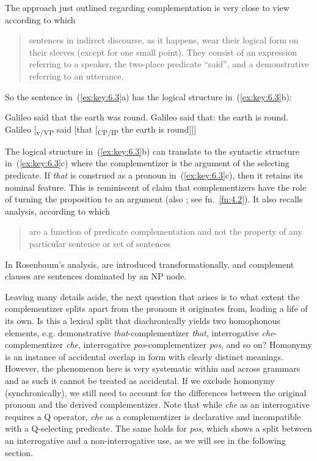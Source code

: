 \documentclass[output=paper]{langsci/langscibook}
\begin{document}
The approach just outlined regarding complementation is very close to
 view according to which \blockquote{sentences
    in indirect discourse, as it happens, wear their logical form on their
    sleeves (except for one small point). They consist of an expression
referring to a speaker, the two-place predicate \enquote{said}, and a
demonstrative referring to an utterance.} So the sentence in~(\ref{ex:key:6.3}a) has the
logical structure in~(\ref{ex:key:6.3}b):

\ea\label{ex:key:6.3}
	\ea Galileo said that the earth was round.
	\ex Galileo said that: the earth is round.
	\ex Galileo [\textsubscript{v/VP} said [that [\textsubscript{CP/}\textsubscript{IP} the earth is round]]]
	\z
\z

The logical structure in~(\ref{ex:key:6.3}b) can translate to the syntactic structure in~(\ref{ex:key:6.3}c)
where the complementizer is the argument of the selecting predicate. If
\emph{that} is construed as a pronoun in~(\ref{ex:key:6.3}c), then it retains its nominal
feature. This is reminiscent of  claim that complementizers
have the role of turning the proposition to an argument (also
\citealt{Kayne2005b}; see fn.~\ref{fn:4.2}). It also recalls 
analysis, according to which  \blockquote{are a function of
    predicate complementation and not the property of any particular sentence
or set of sentences}.  In Rosenbaum’s analysis,  are introduced
transformationally, and complement clauses are sentences dominated by an NP
node.

Leaving many details aside, the next question that arises is to what extent the
complementizer splits apart from the pronoun it originates from, leading a life
of its own. Is this a lexical split that diachronically yields two homophonous
elements, e.g. demonstrative \emph{that}-com\-ple\-men\-tiz\-er \emph{that},
interrogative \emph{che}-com\-ple\-men\-tiz\-er \emph{che}, interrogative
\emph{pos}-complementizer \emph{pos}, and so on? Homonymy is an instance of
accidental overlap in form with clearly distinct meanings. However, the
phenomenon here is very systematic within and across grammars and as such it
cannot be treated as accidental. If we exclude homonymy (synchronically), we
still need to account for the differences between the original pronoun and the
derived complementizer. Note that while \emph{che} as an interrogative
requires a Q operator, \emph{che} as a complementizer is declarative and
incompatible with a Q-selecting predicate. The same holds for 
\emph{pos}, which shows a split between an interrogative and a
non-interrogative use, as we will see in the following section.
\end{document}
